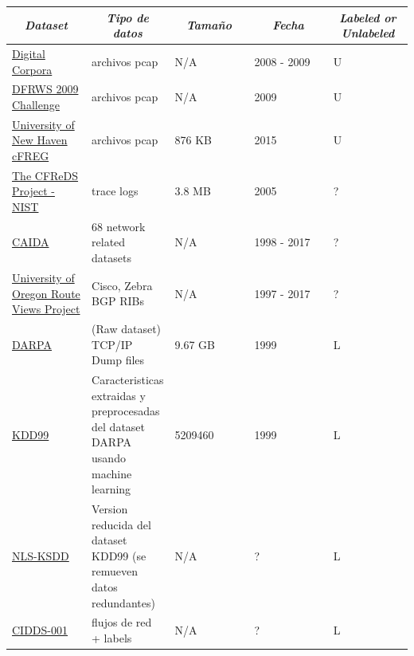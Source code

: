 \documentclass[12pt]{article}
\begin{document}
\newpage
{}
\recalctypearea


\begin{table}[htbp]
\centering
\begin{tabular}{|p{0.2\linewidth}|p{0.2\linewidth}|p{0.2\linewidth}|p{0.2\linewidth}|p{0.2\linewidth}|}\hline
\multicolumn{1}{|c|}{\textit{\textbf{Dataset}}} & 
\multicolumn{1}{c|}{\textit{\textbf{Tipo de datos}}} &
\multicolumn{1}{|c|}{\textit{\textbf{Tamaño}}} & 
\multicolumn{1}{|c|}{\textit{\textbf{Fecha}}} &
\multicolumn{1}{|c|}{\textit{\textbf{Labeled or Unlabeled}}} \tabularnewline \hline

\href{http://digitalcorpora.org/corpora/packet-dumps}{Digital Corpora} & 
archivos pcap &
N/A & 
2008 - 2009 & 
U 
\tabularnewline \hline

\href{https://web.archive.org/web/20160311200806/http://dfrws.org/2009/challenge/submission.shtml}{DFRWS 2009 Challenge} & 
archivos pcap &
N/A & 
2009 & 
U 
\tabularnewline \hline

\href{https://www.unhcfreg.com/datasetsandtools}{University of New Haven cFREG} & 
archivos pcap &
876 KB & 
2015 & 
U 
\tabularnewline \hline

\href{https://www.cfreds.nist.gov/dfrws/Rhino_Hunt.html}{The CFReDS Project - NIST} & 
trace logs &
3.8 MB & 
2005 & 
? 
\tabularnewline \hline

\href{http://www.caida.org/data/overview/}{CAIDA} & 
68 network related datasets &
N/A & 
1998 - 2017 & 
? 
\tabularnewline \hline

\href{http://www.routeviews.org/routeviews/}{University of Oregon Route Views Project} & 
Cisco, Zebra BGP RIBs &
N/A & 
1997 - 2017 & 
? 
\tabularnewline \hline

\href{https://www.ll.mit.edu/r-d/datasets}{DARPA} & 
(Raw dataset) TCP/IP Dump  files &
9.67 GB & 
1999 & 
L 
\tabularnewline \hline

\href{http://kdd.ics.uci.edu/databases/kddcup99/kddcup99.html}{KDD99} & 
Caracteristicas extraidas y preprocesadas del dataset DARPA usando machine learning &
5209460 & 
1999 & 
L 
\tabularnewline \hline

\href{http://www.unb.ca/cic/datasets/nsl.html}{NLS-KSDD} & 
Version reducida del dataset KDD99 (se remueven datos redundantes) &
N/A &
? & 
L 
\tabularnewline \hline


\href{https://www.hs-coburg.de/forschung-kooperation/forschungsprojekte-oeffentlich/ingenieurwissenschaften/cidds-coburg-intrusion-detection-data-sets.html}{CIDDS-001} & 
flujos de red + labels &
N/A &
? & 
L 
\tabularnewline \hline

\end{tabular}
\end{table} 
\end{document}

